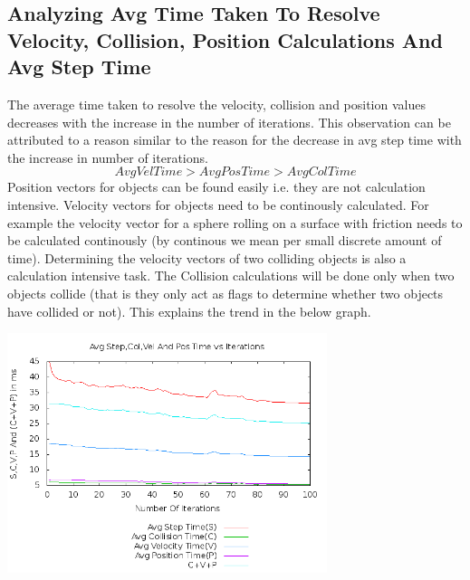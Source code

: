 \documentclass[11pt]{article}
\begin{document}
	\subsection{Analyzing Avg Time Taken To Resolve Velocity, Collision, Position Calculations And Avg Step Time}	
	The average time taken to resolve the velocity, collision and position values decreases with the increase in the number of iterations. This observation can be attributed to a reason similar to the reason for the decrease in avg step time with the increase in number of iterations. \newline
	\begin{equation*} AvgVelTime > AvgPosTime > AvgColTime \end{equation*} \newline
	Position vectors for objects can be found easily i.e. they are not calculation intensive. Velocity vectors for objects need to be continously calculated. For example the velocity vector for a sphere rolling on a surface with friction needs to be calculated continously (by continous we mean per small discrete amount of time). Determining the velocity vectors of two colliding objects is also a calculation intensive task. The Collision calculations will be done only when two objects collide (that is they only act as flags to determine whether two objects have collided or not). This explains the trend in the below graph.  
	
	\begin{center}\includegraphics[height=7cm]{100_30_plot02.png}\end{center}

	
\end{document}
